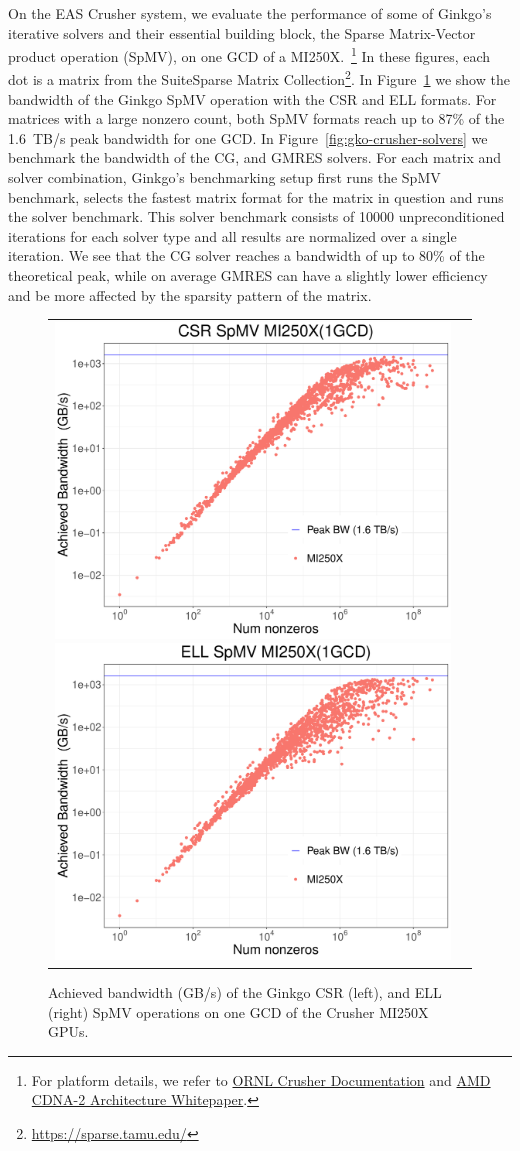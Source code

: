 On the EAS Crusher system, we evaluate the performance of some of Ginkgo's
iterative solvers and their essential building block, the Sparse Matrix-Vector
product operation (SpMV), on one GCD of a MI250X.~\footnote{For platform
  details, we refer to
  \href{https://docs.olcf.ornl.gov/systems/crusher_quick_start_guide.html}{ORNL
    Crusher Documentation} and
  \href{https://www.amd.com/system/files/documents/amd-cdna2-white-paper.pdf}{AMD
    CDNA-2 Architecture Whitepaper}.} In these figures, each dot is a matrix
from the SuiteSparse Matrix Collection\footnote{\url{https://sparse.tamu.edu/}}.
In Figure~\ref{fig:gko-crusher-spmv} we show the bandwidth of the Ginkgo SpMV
operation with the CSR and ELL formats. For matrices with a large nonzero count,
both SpMV formats reach up to 87\% of the 1.6~TB/s peak bandwidth for one GCD.
In Figure~\ref{fig:gko-crusher-solvers} we benchmark the bandwidth of the CG,
and GMRES solvers. For each matrix and solver combination, Ginkgo's benchmarking 
setup first runs the SpMV benchmark, selects the fastest matrix format for the matrix
in question and runs the solver benchmark. This solver benchmark consists of 10000
unpreconditioned iterations for each solver type and all results are normalized over a
single iteration. We see that the CG solver reaches a bandwidth of up to 80\% of the
theoretical peak, while on average GMRES can have a slightly lower efficiency and be
more affected by the sparsity pattern of the matrix.


\begin{figure}[!h]
  \centering
  \begin{tabular}{lr}
    \includegraphics[width=.34\columnwidth]{projects/2.3.3-MathLibs/2.3.3.13-CLOVER/ginkgo_eas/bw_csr_spmv.pdf}
    \includegraphics[width=.34\columnwidth]{projects/2.3.3-MathLibs/2.3.3.13-CLOVER/ginkgo_eas/bw_ell_spmv.pdf}
  \end{tabular}
  \caption{Achieved bandwidth (GB/s) of the Ginkgo CSR (left), and ELL (right) SpMV operations on one GCD
    of the Crusher MI250X GPUs.}
  \label{fig:gko-crusher-spmv}
\end{figure}


